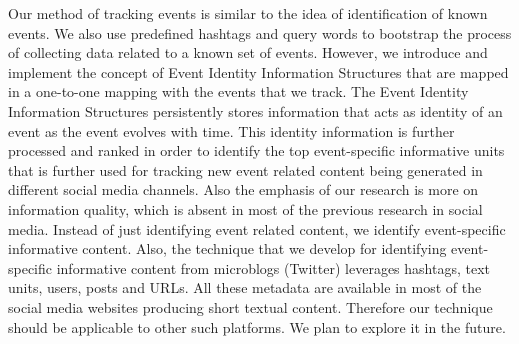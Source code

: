 Our method of tracking events is similar to the idea of identification of known events. We also use predefined hashtags and query words to bootstrap the process of collecting data related to a known set of events. However, we introduce and implement the concept of Event Identity Information Structures that are mapped in a one-to-one mapping with the events that we track. The Event Identity Information Structures persistently stores information that acts as identity of an event as the event evolves with time. This identity information is further processed and ranked in order to identify the top event-specific informative units that is further used for tracking new event related content being generated in different social media channels. Also the emphasis of our research is more on information quality, which is absent in most of the previous research in social media. Instead of just identifying event related content, we identify event-specific informative content. Also, the technique that we develop for identifying event-specific informative content from microblogs (Twitter) leverages hashtags, text units, users, posts and URLs. All these metadata are available in most of the social media websites producing short textual content. Therefore our technique should be applicable to other such platforms. We plan to explore it in the future.










